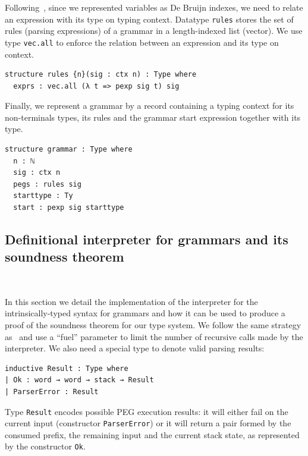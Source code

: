 \documentclass[preprint,12pt]{elsarticle}
\theoremstyle{definition}
\begin{document}
Following~\cite{Ribeiro19}, since we represented variables as De Bruijn indexes, we need to
relate an expression with its type on typing context. Datatype
\lstinline|rules| stores the set of rules (parsing expressions) of a grammar in
a length-indexed list (vector). We use type \lstinline|vec.all| to enforce the relation
between an expression and its type on context.
\begin{lstlisting}
structure rules {n}(sig : ctx n) : Type where
  exprs : vec.all (λ t => pexp sig t) sig
\end{lstlisting}
Finally, we represent a grammar by a record containing a typing context for
its non-terminals types, its rules and the grammar start expression together with
its type.
\begin{lstlisting}
structure grammar : Type where
  n : ℕ
  sig : ctx n
  pegs : rules sig
  starttype : Ty
  start : pexp sig starttype
\end{lstlisting}

\subsection{Definitional interpreter for grammars and its soundness theorem}~\label{sec:pest-interpreter}

In this section we detail the implementation of the interpreter for the
intrinsically-typed syntax for grammars and how it can be used to produce a proof of the
soundness theorem for our type system.
We follow the same strategy as~\cite{Ribeiro19, Amin17} and use a ``fuel'' parameter
to limit the number of recursive calls made by the interpreter. We also need
a special type to denote valid parsing results:
\begin{lstlisting}
inductive Result : Type where
| Ok : word → word → stack → Result
| ParserError : Result
\end{lstlisting}
Type \lstinline|Result| encodes possible PEG execution results: it will either fail
on the current input (constructor \lstinline|ParserError|) or it will return a
pair formed by the consumed prefix, the remaining input and the current stack
state, as represented by the constructor \lstinline|Ok|.
\end{document}
